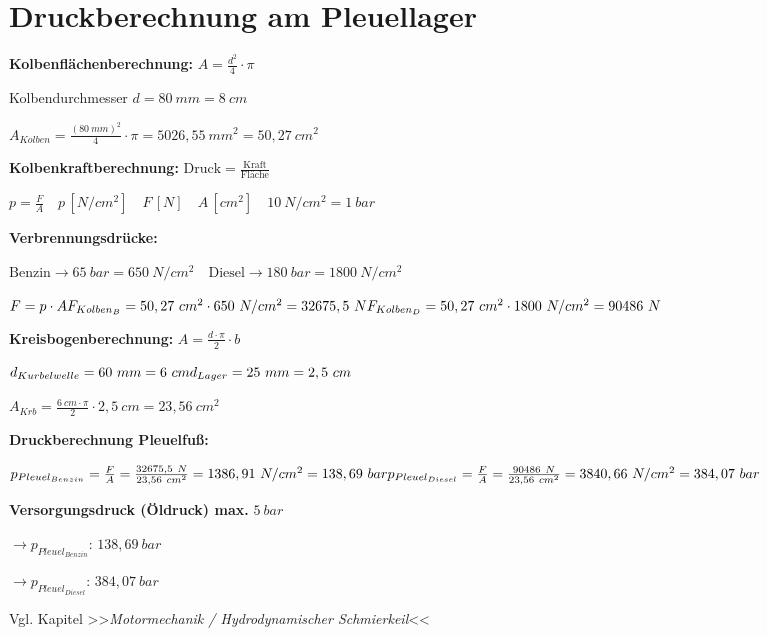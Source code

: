 \section{Druckberechnung am
Pleuellager}\label{druckberechnung-am-pleuellager}

\textbf{Kolbenflächenberechnung:}
$\boxed{A = \frac{d^2}{4} \cdot \pi}$

Kolbendurchmesser $d = 80~mm = 8~cm$

$A_{Kolben} = \frac{(80~mm)^2}{4} \cdot \pi = 5026,55~mm^2 = 50,27~cm^2$

\textbf{Kolbenkraftberechnung:}
$\boxed{\text{Druck} = \frac{\text{Kraft}}{\text{Fläche}}}$

$\boxed{p = \frac{F}{A}} \quad \boxed{p\,[N/cm^2] \quad F\,[N] \quad A\,[cm^2]} \quad \boxed{10~N/cm^2 = 1~bar}$

\textbf{Verbrennungsdrücke:}

$\text{Benzin} \to 65~bar = 650~N/cm^2 \quad \text{Diesel} \to 180~bar = 1800~N/cm^2$

$F = p \cdot A \\ F_{Kolben_B} = 50,27~cm^2 \cdot 650~N/cm^2  = 32675,5~N \\ F_{Kolben_D} = 50,27~cm^2 \cdot 1800~N/cm^2  = 90486~N$

\textbf{Kreisbogenberechnung:}
$\boxed{A = \frac{d \cdot \pi}{2} \cdot b}$

$d_{Kurbelwelle} = 60~mm = 6~cm \\ d_{Lager} = 25~mm = 2,5~cm$

$A_{Krb} = \frac{6~cm \cdot \pi}{2} \cdot 2,5~cm  = 23,56~cm^2$

\textbf{Druckberechnung Pleuelfuß:}

$p_{Pleuel_{Benzin}} = \frac{F}{A}  = \frac{32675,5~N}{23,56~cm^2}  = 1386,91~N/cm^2  = 138,69~bar \\ p_{Pleuel_{Diesel}} = \frac{F}{A}  = \frac{90486~N}{23,56~cm^2}  = 3840,66~N/cm^2  = 384,07~bar$

\textbf{Versorgungsdruck (Öldruck) max.} $5~bar$

$\to p_{Pleuel_{Benzin}}:\,138,69~bar$

$\to p_{Pleuel_{Diesel}}:\,384,07~bar$

Vgl. Kapitel >>\emph{Motormechanik / Hydrodynamischer Schmierkeil}<<
